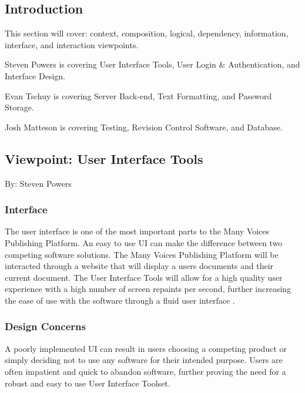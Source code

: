 \documentclass[letterpaper, 10pt, draftclsnofoot, compsoc, onecolumn]{IEEEtran}
\begin{document}
\subsection{Introduction}
{\noindent This section will cover: context, composition, logical, dependency, information, interface, and interaction viewpoints. \par}

{\noindent Steven Powers is covering User Interface Tools, User Login \& Authentication, and Interface Design.  \par}
{\noindent Evan Tschuy is covering Server Back-end, Text Formatting, and Password Storage.  \par}
{\noindent Josh Matteson is covering Testing, Revision Control Software, and Database.  \par}



\subsection{Viewpoint: User Interface Tools}
{\noindent By: Steven Powers \par}

\subsubsection{Interface}
{\noindent The user interface is one of the most important parts to the Many 
Voices Publishing Platform. An easy to use UI can make the difference between 
two competing software solutions. The Many Voices Publishing Platform will be 
interacted through a website that will display a users documents and their current
document. The User Interface Tools will allow for a high quality user experience
with a high number of screen repaints per second, further increasing the ease of use
with the software through a fluid user interface \cite{Eisenberg}.\par}

\subsubsection{Design Concerns}
{\noindent A poorly implemented UI can result in users choosing a competing 
product or simply deciding not to use any software for their intended purpose. 
Users are often impatient and quick to abandon software, 
further proving the need for a robust and easy to use User Interface Toolset.  \par}
\end{document}
